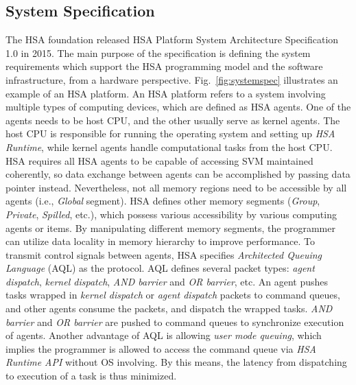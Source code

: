         \subsection{System Specification}
        The HSA foundation released HSA Platform System Architecture Specification 1.0 \cite{systemspec} in 2015.
        The main purpose of the specification is defining the system requirements which support the HSA programming model and the software infrastructure, from a hardware perspective.
        Fig.~\ref{fig:systemspec} illustrates an example of an HSA platform.
        An HSA platform refers to a system involving multiple types of computing devices, 
        which are defined as HSA agents.
        One of the agents needs to be host CPU, and the other usually serve as kernel agents. 
        The host CPU is responsible for running the operating system and setting up \textit{HSA Runtime},
        while kernel agents handle computational tasks from the host CPU.
        HSA requires all HSA agents to be capable of accessing SVM maintained coherently, 
        so data exchange between agents can be accomplished by passing data pointer instead.
        Nevertheless, not all memory regions need to be accessible by all agents (i.e., \textit{Global} segment).
        HSA defines other memory segments (\textit{Group}, \textit{Private}, \textit{Spilled}, etc.), 
        which possess various accessibility by various computing agents or items.
        By manipulating different memory segments, the programmer can utilize data locality in memory hierarchy to improve performance.
        To transmit control signals between agents, HSA specifies \textit{Architected Queuing Language} (AQL) as the protocol. 
        AQL defines several packet types: \textit{agent dispatch}, \textit{kernel dispatch}, \textit{AND barrier} and \textit{OR barrier}, etc.
        An agent pushes tasks wrapped in \textit{kernel dispatch} or \textit{agent dispatch} packets to command queues, 
        and other agents consume the packets, and dispatch the wrapped tasks.
        \textit{AND barrier} and \textit{OR barrier} are pushed to command queues to synchronize execution of agents.
        Another advantage of AQL is allowing \textit{user mode queuing},
        which implies the programmer is allowed to access the command queue via \textit{HSA Runtime API} without OS involving.
        By this means, the latency from dispatching to execution of a task is thus minimized.
        \vspace{\textfig}
